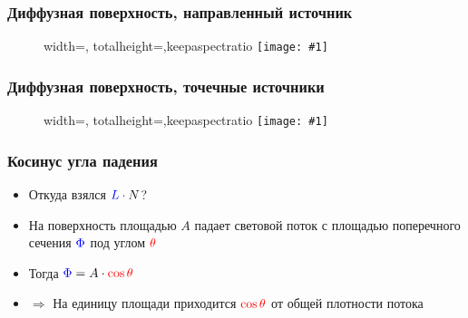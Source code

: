 \documentclass[10pt,handout]{beamer}
\newcommand{\slideimage}[1]{
  \begin{figure}
    \begin{adjustbox}{width=\textwidth, totalheight=\textheight-2\baselineskip-2\baselineskip,keepaspectratio}
      \texttt{[image: \#1]}
    \end{adjustbox}
  \end{figure}
}
\begin{document}
\begin{frame}[fragile]
\frametitle{Диффузная поверхность, направленный источник}
\slideimage{diffuse.png}
\end{frame}

\begin{frame}[fragile]
\frametitle{Диффузная поверхность, точечные источники}
\slideimage{point_lights.png}
\end{frame}


\begin{frame}[fragile]
\frametitle{Косинус угла падения}
\begin{itemize}
\item Откуда взялся \begin{math}{\color{blue}L} \cdot N\end{math}?
\pause
\item На поверхность площадью \begin{math}A\end{math} падает световой поток с площадью поперечного сечения \begin{math}{\color{blue} \Phi}\end{math} под углом \begin{math}\color{red}\theta\end{math}
\item Тогда \begin{math}{\color{blue} \Phi} = A \cdot {\color{red} \cos \theta}\end{math}
\item \begin{math}\Longrightarrow\end{math} На единицу площади приходится \begin{math}{\color{red}\cos \theta}\end{math} от общей плотности потока
\end{itemize}
\begin{center}
\end{center}
\end{frame}
\end{document}

